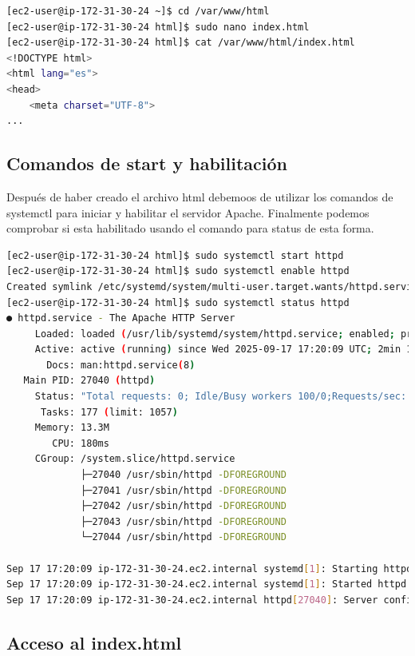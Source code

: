 \documentclass{article}
\begin{document}
\begin{lstlisting}[style=consola, language=bash, caption={Terminal, index.html}]
[ec2-user@ip-172-31-30-24 ~]$ cd /var/www/html
[ec2-user@ip-172-31-30-24 html]$ sudo nano index.html
[ec2-user@ip-172-31-30-24 html]$ cat /var/www/html/index.html
<!DOCTYPE html>
<html lang="es">
<head>
    <meta charset="UTF-8">
...
\end{lstlisting}
\newpage
\subsection{Comandos de start y habilitación}

	Después de haber creado el archivo html debemoos de utilizar los comandos de systemctl para iniciar y habilitar el servidor Apache. Finalmente podemos comprobar si esta habilitado usando el comando para status de esta forma. 

\begin{lstlisting}[style=consola, language=bash, caption={Terminal, systemctl}]
[ec2-user@ip-172-31-30-24 html]$ sudo systemctl start httpd
[ec2-user@ip-172-31-30-24 html]$ sudo systemctl enable httpd
Created symlink /etc/systemd/system/multi-user.target.wants/httpd.service → /usr/lib/systemd/system/httpd.service.
[ec2-user@ip-172-31-30-24 html]$ sudo systemctl status httpd
● httpd.service - The Apache HTTP Server
     Loaded: loaded (/usr/lib/systemd/system/httpd.service; enabled; preset: disabled)
     Active: active (running) since Wed 2025-09-17 17:20:09 UTC; 2min 11s ago
       Docs: man:httpd.service(8)
   Main PID: 27040 (httpd)
     Status: "Total requests: 0; Idle/Busy workers 100/0;Requests/sec: 0; Bytes served/sec:   0 B/sec"
      Tasks: 177 (limit: 1057)
     Memory: 13.3M
        CPU: 180ms
     CGroup: /system.slice/httpd.service
             ├─27040 /usr/sbin/httpd -DFOREGROUND
             ├─27041 /usr/sbin/httpd -DFOREGROUND
             ├─27042 /usr/sbin/httpd -DFOREGROUND
             ├─27043 /usr/sbin/httpd -DFOREGROUND
             └─27044 /usr/sbin/httpd -DFOREGROUND

Sep 17 17:20:09 ip-172-31-30-24.ec2.internal systemd[1]: Starting httpd.service - The Apache HTTP Server...
Sep 17 17:20:09 ip-172-31-30-24.ec2.internal systemd[1]: Started httpd.service - The Apache HTTP Server.
Sep 17 17:20:09 ip-172-31-30-24.ec2.internal httpd[27040]: Server configured, listening on: port 80
\end{lstlisting}

\subsection{Acceso al index.html}
\end{document}
